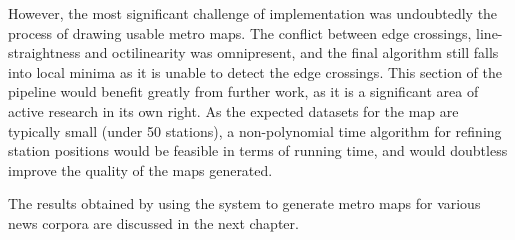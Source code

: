 However, the most significant challenge of implementation was undoubtedly the process of drawing usable metro maps. The conflict between edge crossings, line-straightness and octilinearity was omnipresent, and the final algorithm still falls into local minima as it is unable to detect the edge crossings. This section of the pipeline would benefit greatly from further work, as it is a significant area of active research in its own right. As the expected datasets for the map are typically small (under 50 stations),  a non-polynomial time algorithm for refining station positions would be feasible in terms of running time, and would doubtless improve the quality of the maps generated.

The results obtained by using the system to generate metro maps for various news corpora are discussed in the next chapter.

